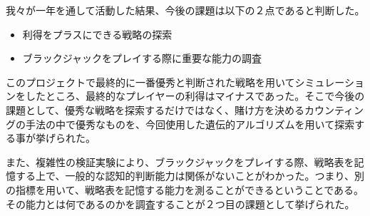 我々が一年を通して活動した結果、今後の課題は以下の２点であると判断した。

\begin{itemize}
\item 利得をプラスにできる戦略の探索
\item ブラックジャックをプレイする際に重要な能力の調査
\end{itemize}

このプロジェクトで最終的に一番優秀と判断された戦略を用いてシミュレーションをしたところ、最終的なプレイヤーの利得はマイナスであった。そこで今後の課題として、優秀な戦略を探索するだけではなく、賭け方を決めるカウンティングの手法の中で優秀なものを、今回使用した遺伝的アルゴリズムを用いて探索する事が挙げられた。

また、複雑性の検証実験により、ブラックジャックをプレイする際、戦略表を記憶する上で、一般的な認知的判断能力は関係がないことがわかった。つまり、別の指標を用いて、戦略表を記憶する能力を測ることができるということである。その能力とは何であるのかを調査することが２つ目の課題として挙げられた。

